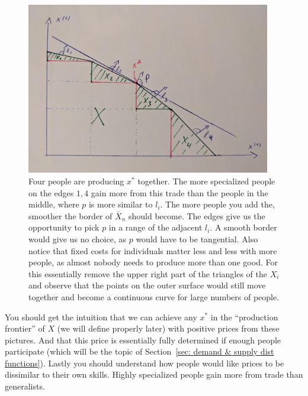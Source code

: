\begin{figure}
	\includegraphics[width=0.95\textwidth]{images/4_people_trade.jpeg}
	\caption{
		Four people are producing \(x^*\) together. The more specialized people
		on the edges \(1,4\) gain more from this trade than the people in the
		middle, where \(p\) is more similar to \(l_i\). The more people you add
		the, smoother the border of \(\bar{X}_n\) should become. The edges
		give us the opportunity to pick \(p\) in a range of the adjacent \(l_i\).
		A smooth border would give us no choice, as \(p\) would have to be
		tangential. Also notice that fixed costs for individuals matter less and
		less with more people, as almost nobody needs to produce more than one
		good. For this essentially remove the upper right part of the triangles
		of the \(X_i\) and observe that the points on the outer surface would
		still move together and become a continuous curve for large numbers of
		people.
	}	
\end{figure}

You should get the intuition that we can achieve any \(x^*\) in the ``production
frontier'' of \(X\) (we will define properly later) with positive prices from
these pictures. And that this price is essentially fully determined if enough
people participate (which will be the topic of Section~\ref{sec: demand & supply
dist functions}). Lastly you should understand how people would like prices to
be dissimilar to their own skills. Highly specialized people gain more from
trade than generalists.

\FloatBarrier